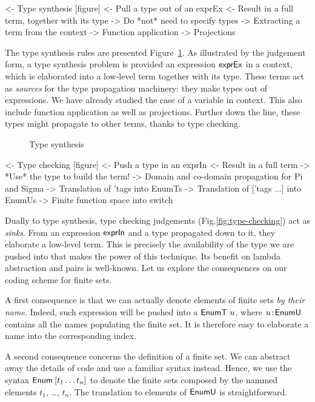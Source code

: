 \begin{wstructure}
<- Type synthesis [figure]
    <- Pull a type out of an exprEx
    <- Result in a full term, together with its type
    -> Do *not* need to specify types
        -> Extracting a term from the context
        -> Function application
        -> Projections
\end{wstructure}

The type synthesis rules are presented
Figure~\ref{fig:type-synthesis}. As illustrated by the judgement form,
a type synthesis problem is provided an expression $\textsf{exprEx}$ in a
context, which is elaborated into a low-level term together with its
type. These terms act as \emph{sources} for the type propagation
machinery: they make types out of expressions. We have already studied
the case of a variable in context. This also include function
application as well as projections. Further down the line, these types
might propagate to other terms, thanks to type checking.

\begin{figure}

\caption{Type synthesis}
\label{fig:type-synthesis}
\end{figure}



\begin{wstructure}
<- Type checking [figure]
    <- Push a type in an exprIn
    <- Result in a full term
    -> *Use* the type to build the term!
        -> Domain and co-domain propagation for Pi and Sigma
        -> Translation of 'tags into EnumTs
        -> Translation of ['tags ...] into EnumUs
        -> Finite function space into switch
\end{wstructure}

Dually to type synthesis, type checking judgements
(Fig.\ref{fig:type-checking}) act as \emph{sinks}. From an expression
$\textsf{exprIn}$ and a type propagated down to it, they elaborate a low-level
term. This is precisely the availability of the type we are pushed
into that makes the power of this technique. Its benefit on lambda
abstraction and pairs is well-known. Let us explore the consequences
on our coding scheme for finite sets.

A first consequence is that we can actually denote elements of finite
sets \emph{by their name}. Indeed, such expression will be pushed into
a $\EnumT{u}$, where $\Bhab{u}{\EnumU}$ contains all the names
populating the finite set. It is therefore easy to elaborate a name
into the corresponding index.

A second consequence concerns the definition of a finite set. We can
abstract away the details of code and use a familiar syntax
instead. Hence, we use the syntax $\Enum\: [t_1 \ldots t_n]$ to denote
the finite sets composed by the nammed elements $t_1$, \ldots,
$t_n$. The translation to elements of $\EnumU$ is straightforward.


